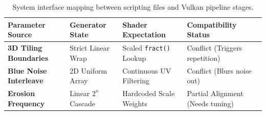 \documentclass[11pt,a4paper]{article}
\begin{document}
\begin{table}[h!]
\centering
\small
\begin{tabular}{llll}
\toprule
\textbf{Parameter Source} & \textbf{Generator State} & \textbf{Shader Expectation} & \textbf{Compatibility Status} \\ \midrule
\textbf{3D Tiling Boundaries} & Strict Linear Wrap & Scaled \texttt{fract()} Lookup & \color{red}Conflict (Triggers repetition) \\
\textbf{Blue Noise Interleave} & 2D Uniform Array & Continuous UV Filtering & \color{red}Conflict (Blurs noise out) \\
\textbf{Erosion Frequency} & Linear $2^n$ Cascade & Hardcoded Scale Weights & \color{orange}Partial Alignment (Needs tuning) \\ \bottomrule
\end{tabular}
\caption{System interface mapping between scripting files and Vulkan pipeline stages.}
\end{table}
\end{document}
